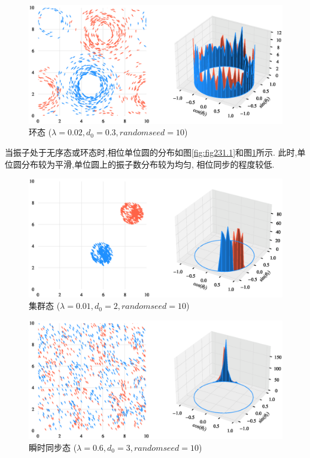 \documentclass{article}
\begin{document}
\begin{figure}[H]
	\centering
	\includegraphics[width=\textwidth]{./figs/CorrectCoupling_uniform_0.020_0.30.eps}
	\vspace{-1cm}
	\caption{环态 ($\lambda=0.02, d_0=0.3, random seed=10$)}
	\label{fig:fig231.2}
\end{figure}

当振子处于无序态或环态时,相位单位圆的分布如图\ref{fig:fig231.1}和图\ref{fig:fig231.2}所示. 此时,单位圆分布较为平滑,单位圆上的振子数分布较为均匀, 相位同步的程度较低.

\begin{figure}[H]
	\centering
	\includegraphics[width=\textwidth]{./figs/CorrectCoupling_uniform_0.010_2.00.eps}
	\vspace{-1cm}
	\caption{集群态 ($\lambda=0.01, d_0=2, random seed=10$)}
	\label{fig:fig231.3}
\end{figure}

\begin{figure}[H]
	\centering
	\includegraphics[width=\textwidth]{./figs/CorrectCoupling_uniform_0.600_3.00.eps}
	\vspace{-1cm}
	\caption{瞬时同步态 ($\lambda=0.6, d_0=3, random seed=10$)}
	\label{fig:fig231.4}
\end{figure}
\end{document}
